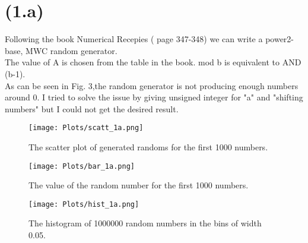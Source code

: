 \section{(1.a)}

Following the book Numerical Recepies ( page 347-348) we can write a power2-base, MWC random generator.\\
The value of A is chosen from the table in the book. mod b is equivalent to AND (b-1).\\
As can be seen in Fig. 3,the random generator is not producing enough numbers around 0.
I tried to solve the issue by giving unsigned integer for "a" and "shifting numbers" but I could not get the desired result.\\



\begin{figure}[!htb]
  \centering
  \texttt{[image: Plots/scatt\_1a.png]}
  \caption{The scatter plot of generated randoms for the first 1000 numbers.}
  \label{fig:fig1}
\end{figure}

\begin{figure}[!htb]
  \centering
  \texttt{[image: Plots/bar\_1a.png]}
  \caption{The value of the random number for the first 1000 numbers.}
  \label{fig:fig2}
\end{figure}

\begin{figure}[!htb]
  \centering
  \texttt{[image: Plots/hist\_1a.png]}
  \caption{The histogram of 1000000 random numbers in the bins of width 0.05.}
  \label{fig:fig3}
\end{figure}

\clearpage
